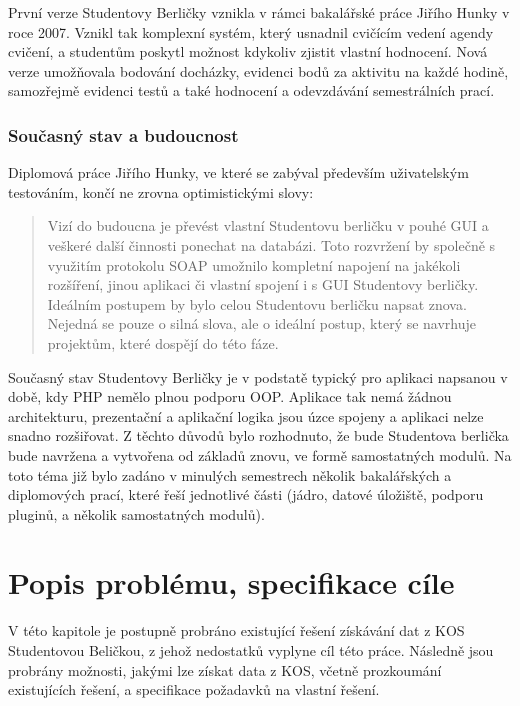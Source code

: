\documentclass[11pt,twoside,a4paper]{book}
\begin{document}
První  verze Studentovy Berličky vznikla v rámci bakalářské práce Jiřího Hunky v roce 2007. Vznikl tak komplexní systém, který usnadnil cvičícím vedení agendy cvičení, a studentům poskytl možnost kdykoliv zjistit vlastní hodnocení. Nová verze umožňovala bodování docházky, evidenci bodů za aktivitu na každé hodině, samozřejmě evidenci testů a také hodnocení a odevzdávání semestrálních prací.

\subsection{Současný stav a budoucnost}

Diplomová práce Jiřího Hunky, ve které se zabýval především uživatelským testováním, končí ne zrovna optimistickými slovy: 
\begin{quotation}
Vizí do budoucna je převést vlastní Studentovu berličku v pouhé GUI a
veškeré další činnosti ponechat na databázi. Toto rozvržení by společně
s využitím protokolu SOAP umožnilo kompletní napojení na jakékoli rozšíření, jinou aplikaci či vlastní spojení i s GUI Studentovy berličky.
Ideálním postupem by bylo celou Studentovu berličku napsat znova. Nejedná se pouze o silná slova, ale o ideální postup, který se navrhuje projektům, které dospějí do této fáze.
\end{quotation}

Současný stav Studentovy Berličky je v podstatě typický pro aplikaci napsanou v době, kdy PHP nemělo plnou podporu OOP. Aplikace tak nemá žádnou architekturu, prezentační a aplikační logika jsou úzce spojeny a aplikaci nelze snadno rozšiřovat. Z těchto důvodů bylo rozhodnuto, že bude Studentova berlička bude navržena a vytvořena od základů znovu, ve formě samostatných modulů. Na toto téma již bylo zadáno v minulých semestrech několik bakalářských a diplomových prací, které řeší jednotlivé části (jádro, datové úložiště, podporu pluginů, a několik samostatných modulů).



\chapter{Popis problému, specifikace cíle}
\label{popis}
V této kapitole je postupně probráno existující řešení získávání dat z KOS Studentovou Beličkou, z jehož nedostatků vyplyne cíl této práce. Následně jsou probrány možnosti, jakými lze získat data z KOS, včetně prozkoumání existujících řešení, a specifikace požadavků na vlastní řešení.  
\end{document}
